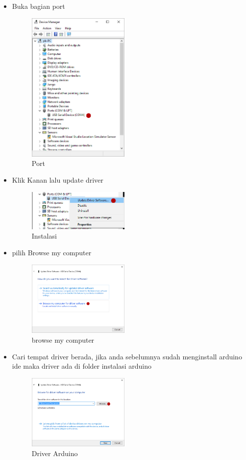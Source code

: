 \begin{enumerate}
\begin{itemize}
	\item Buka bagian port
	\begin{figure}[ht!]
		\includegraphics[width=5cm]{figures/5/1174079/7a.png}
		\centering
		\caption{Port}
	\end{figure}

	\item Klik Kanan lalu update driver
	\begin{figure}[ht!]
		\includegraphics[width=5cm]{figures/5/1174079/6a.png}
		\centering
		\caption{Instalasi}
	\end{figure}

	\item pilih Browse my computer\begin{figure}[ht!]
		\includegraphics[width=5cm]{figures/5/1174079/5a.png}
		\centering
		\caption{browse my computer}
	\end{figure}

	\item Cari tempat driver berada, jika anda sebelumnya sudah menginstall arduino ide maka driver ada di folder instalasi arduino
	\begin{figure}[ht!]
		\includegraphics[width=5cm]{figures/5/1174079/4a.png}
		\centering
		\caption{Driver Arduino}
	\end{figure}
	

\end{itemize}
\end{enumerate}
